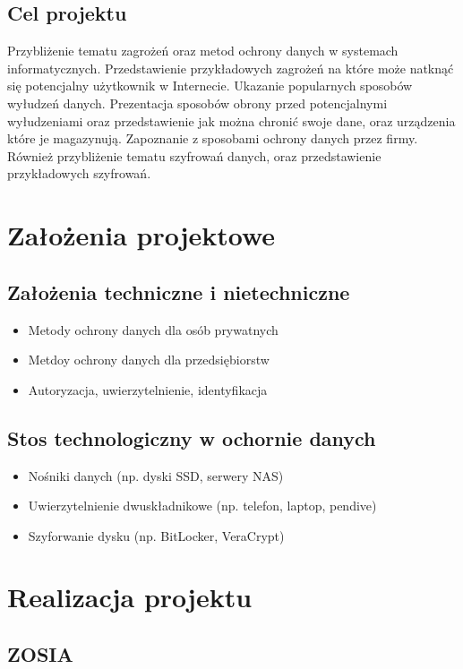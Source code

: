 \documentclass[12pt,a4paper]{article}
\begin{document}
\subsection{Cel projektu}
Przybliżenie tematu zagrożeń oraz metod ochrony danych w systemach informatycznych. Przedstawienie przykładowych zagrożeń na które może natknąć się potencjalny użytkownik w Internecie. Ukazanie popularnych sposobów wyłudzeń danych. Prezentacja sposobów obrony przed potencjalnymi wyłudzeniami oraz przedstawienie jak można chronić swoje dane, oraz urządzenia które je magazynują. Zapoznanie z sposobami ochrony danych przez firmy. Również przybliżenie tematu szyfrowań danych, oraz przedstawienie przykładowych szyfrowań. 

\newpage

\section{Założenia projektowe}

\subsection{Założenia techniczne i nietechniczne}
\begin{itemize}
\item Metody ochrony danych dla osób prywatnych
\item Metdoy ochrony danych dla przedsiębiorstw
\item Autoryzacja, uwierzytelnienie, identyfikacja
\end{itemize}
\subsection{Stos technologiczny w ochornie danych}
\begin{itemize}
\item Nośniki danych (np. dyski SSD, serwery NAS)
\item Uwierzytelnienie dwuskładnikowe (np. telefon, laptop, pendive)
\item Szyforwanie dysku (np. BitLocker,  VeraCrypt)

\end{itemize}

\newpage
\section{Realizacja projektu}

\subsection{ZOSIA}
\end{document}
